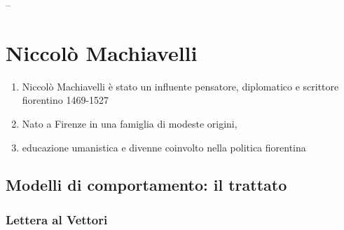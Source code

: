 \documentclass{article}
\begin{document}
--

\newpage
\section{Niccolò Machiavelli}

\begin{enumerate}
    \item Niccolò Machiavelli è stato un influente pensatore, diplomatico e scrittore fiorentino 1469-1527
    \item Nato a Firenze in una famiglia di modeste origini,
    \item educazione umanistica e divenne coinvolto nella politica fiorentina
\end{enumerate}

\subsection{Modelli di comportamento: il trattato}
\subsubsection{Lettera al Vettori}
\end{document}
